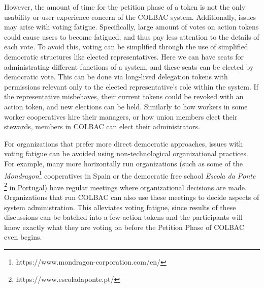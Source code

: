 
However, the amount of time for the petition phase of a token is not the only
usability or user experience concern of the COLBAC system. Additionally, issues
may arise with voting fatigue. Specifically, large amount of votes on action
tokens could cause users to become fatigued, and thus pay less attention to the
details of each vote. To avoid this, voting can be simplified through the use of
simplified democratic structures like elected representatives. Here we can have
seats for administrating different functions of a system, and these seats can be
elected by democratic vote. This can be done via long-lived delegation tokens
with permissions relevant only to the elected representative's role within the
system. If the representative misbehaves, their current tokens could be revoked
with an action token, and new elections can be held. Similarly to how workers in
some worker cooperatives hire their managers, or how union members elect their
stewards, members in COLBAC can elect their administrators.

For organizations that prefer more direct democratic approaches, issues with
voting fatigue can be avoided using non-technological organizational practices.
For example, many more horizontally run organizations (such as some of the 
\textit{Mondragon}\footnote{https://www.mondragon-corporation.com/en/}
cooperatives in Spain or the democratic free school \textit{Escola da Ponte}
\footnote{https://www.escoladaponte.pt/} in Portugal) have regular meetings
where organizational decisions are made. Organizations that run COLBAC can also
use these meetings to decide aspects of system administration. This alleviates
voting fatigue, since results of these discussions can be batched into a few
action tokens and the participants will know exactly what they are voting on
before the Petition Phase of COLBAC even begins.
